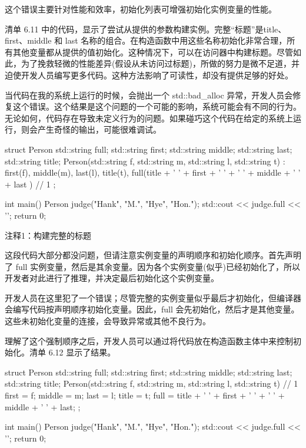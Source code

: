 这个错误主要针对性能和效率，初始化列表可增强初始化实例变量的性能。


清单 6.11 中的代码，显示了尝试从提供的参数构建实例。完整“标题”是title、first、middle 和 last 名称的组合。在构造函数中用这些名称初始化非常合理，所有其他变量都从提供的值初始化。这种情况下，可以在访问器中构建标题。尽管如此，为了挽救轻微的性能差异(假设从未访问过标题)，所做的努力是微不足道，并迫使开发人员编写更多代码。这种方法影响了可读性，却没有提供足够的好处。

当代码在我的系统上运行的时候，会抛出一个 std::bad\_alloc 异常，开发人员会修复这个错误。这个结果是这个问题的一个可能的影响，系统可能会有不同的行为。无论如何，代码存在导致未定义行为的问题。如果碰巧这个代码在给定的系统上运行，则会产生奇怪的输出，可能很难调试。


\begin{cpp}
struct Person {
  std::string full;
  std::string first;
  std::string middle;
  std::string last;
  std::string title;
  Person(std::string f, std::string m, std::string l, std::string t) :
    first(f), middle(m), last(l), title(t),
    full(title + ' ' + first + ' ' + ' ' + middle + ' ' + last ) {} // 1
};

int main() {
  Person judge("Hank", "M.", "Hye", "Hon.");
  std::cout << judge.full << '\n';
  return 0;
}
\end{cpp}

{\footnotesize
注释1：构建完整的标题
}


这段代码大部分都没问题，但请注意实例变量的声明顺序和初始化顺序。首先声明了 full 实例变量，然后是其余变量。因为各个实例变量(似乎)已经初始化了，所以开发者对此进行了推理，并决定最后初始化这个实例变量。

开发人员在这里犯了一个错误；尽管完整的实例变量似乎最后才初始化，但编译器会编写代码按声明顺序初始化变量。因此，full 会先初始化，然后才是其他变量。这些未初始化变量的连接，会导致异常或其他不良行为。

理解了这个强制顺序之后，开发人员可以通过将代码放在构造函数主体中来控制初始化。清单 6.12 显示了结果。


\begin{cpp}
struct Person {
  std::string full;
  std::string first;
  std::string middle;
  std::string last;
  std::string title;
  Person(std::string f, std::string m, std::string l, std::string t) { // 1
    first = f; middle = m; last = l; title = t;
    full = title + ' ' + first + ' ' + ' ' + middle + ' ' + last;
  }
};

int main() {
  Person judge("Hank", "M.", "Hye", "Hon.");
  std::cout << judge.full << '\n';
  return 0;
}
\end{cpp}

